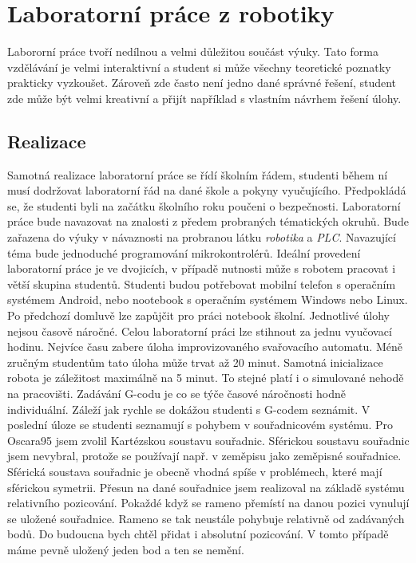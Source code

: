 \section{Laboratorní práce z robotiky}
Labororní práce tvoří nedílnou a velmi důležitou součást výuky. 
Tato forma vzdělávání je velmi interaktivní a student si může všechny teoretické poznatky prakticky vyzkoušet. Zároveň zde často není jedno dané správné řešení, student zde může být velmi kreativní a přijít například s vlastním návrhem řešení úlohy.

\subsection{Realizace}
Samotná realizace laboratorní práce se řídí školním řádem, studenti během ní musí dodržovat laboratorní řád na dané škole a pokyny vyučujícího. Předpoklá\-dá se, že studenti byli na začátku školního roku poučeni o bezpečnosti. Laboratorní práce bude navazovat na znalosti z předem probraných tématických okruhů. 
Bude zařazena do výuky v návaznosti na probranou látku \textit{robotika} a \textit{PLC}. Navazující téma bude jednoduché programování mikrokontrolérů. Ideální provedení laboratorní práce je ve dvojicích, v případě nutnosti může s robotem pracovat i větší skupina studentů. Studenti budou potřebovat mobilní telefon s operačním systémem Android, nebo nootebook s operačním systémem Windows nebo Linux. Po předchozí domluvě lze zapůjčit pro práci notebook školní. Jednotlivé úlohy nejsou časově náročné. Celou laboratorní práci lze stihnout za jednu vyučovací hodinu. Nejvíce času zabere úloha improvizovaného svařovacího automatu. Méně zručným studentům tato úloha může trvat až 20 minut. Samotná inicializace robota je záležitost maximálně na 5 minut. To stejné platí i o simulované nehodě na pracovišti. Zadávání G-codu je co se týče časové náročnosti hodně individuální. Záleží jak rychle se dokážou studenti s G-codem seznámit. V poslední úloze se studenti seznamují s pohybem v souřadnicovém systému. Pro Oscara95 jsem zvolil Kartézskou soustavu souřadnic. Sférickou soustavu souřadnic jsem nevybral, protože se používají např. v zeměpisu jako zeměpisné sou\-řa\-dni\-ce. Sférická soustava souřadnic je obecně vhodná spíše v problémech, které mají sférickou symetrii. Přesun na dané souřadnice jsem realizoval na základě systému relativního pozicování. Pokaždé když se rameno přemístí na danou pozici vynulují se uložené souřadnice. Rameno se tak neustále pohybuje relativně od zadávaných bodů. Do budoucna bych chtěl přidat i absolutní pozicování. V tomto případě máme pevně uložený jeden bod a ten se nemění. \cite{Kartezske-wiki} \cite{Sfericke-wiki}

